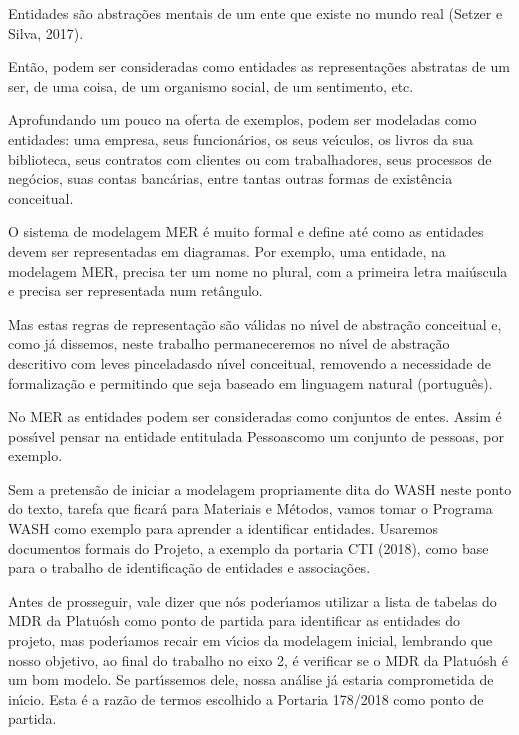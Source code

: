 \documentclass[
12pt,		%
openright,	%
twoside,  %
a4paper,			%
chapter=TITLE,		%
english,			%
french,				%
spanish,			%
brazil				%
]{USPSC-classe/USPSC}
\begin{document}
Entidades s\~ao abstra\c{c}\~oes mentais de um ente que existe no mundo real  (Setzer e Silva, 2017).




Ent\~ao, podem ser consideradas como entidades as representa\c{c}\~oes abstratas de um ser, de uma coisa, de um organismo social, de um sentimento, etc.




Aprofundando um pouco na oferta de exemplos, podem ser modeladas como entidades: uma empresa, seus funcion\'arios, os seus ve\'{\i}culos, os livros da sua biblioteca, seus contratos com clientes ou com trabalhadores, seus processos de neg\'ocios, suas contas banc\'arias, entre tantas outras formas de exist\^encia conceitual.




O sistema de modelagem MER \'e muito formal e define at\'e como as entidades devem ser representadas em diagramas. Por exemplo, uma entidade, na modelagem MER, precisa ter um nome no plural, com a primeira letra mai\'uscula e precisa ser representada num ret\^angulo.




Mas estas regras de representa\c{c}\~ao s\~ao v\'alidas no n\'{\i}vel de abstra\c{c}\~ao conceitual e, como j\'a dissemos, neste trabalho permaneceremos no n\'{\i}vel de abstra\c{c}\~ao descritivo com \textquotedbl leves pinceladas\textquotedbl  do n\'{\i}vel conceitual, removendo a necessidade de formaliza\c{c}\~ao e permitindo que seja baseado em linguagem natural (portugu\^es).




No MER as entidades podem ser consideradas como conjuntos de entes. Assim \'e poss\'{\i}vel pensar na entidade entitulada \textquotedbl Pessoas\textquotedbl  como um conjunto de pessoas, por exemplo.




Sem a pretens\~ao de iniciar a modelagem propriamente dita do WASH neste ponto do texto, tarefa que ficar\'a para Materiais e M\'etodos, vamos tomar o Programa WASH como exemplo para aprender a identificar entidades. Usaremos documentos formais do Projeto, a exemplo da portaria CTI (2018), como base para o trabalho de identifica\c{c}\~ao de entidades e associa\c{c}\~oes.




Antes de prosseguir, vale dizer que n\'os poder\'{\i}amos utilizar a lista de tabelas do MDR da Platu\'osh como ponto de partida para identificar as entidades do projeto, mas poder\'{\i}amos recair em v\'{\i}cios da modelagem inicial, lembrando que nosso objetivo, ao final do trabalho no eixo 2, \'e verificar se o MDR da Platu\'osh \'e um bom modelo. Se part\'{\i}ssemos dele, nossa an\'alise j\'a estaria comprometida de in\'{\i}cio. Esta \'e a raz\~ao de termos escolhido a Portaria 178/2018 como ponto de partida.
\end{document}
